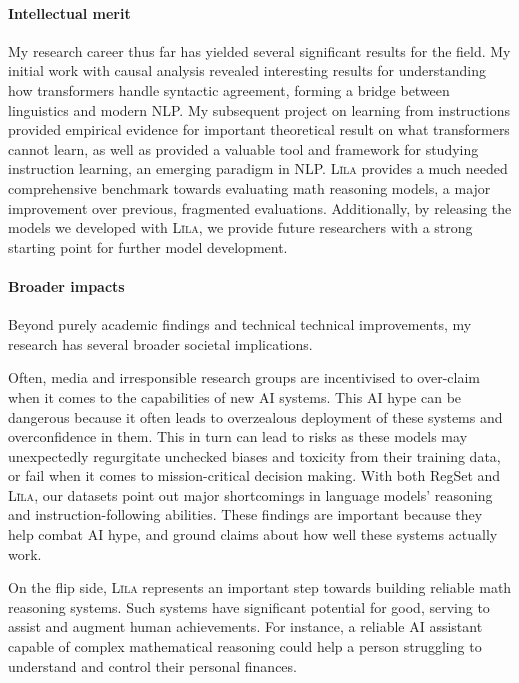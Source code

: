 \documentclass[11pt]{article}
\newcommand\lila{\textsc{L\={\i}la}\xspace}
\begin{document}
\paragraph{Intellectual merit}

My research career thus far has yielded several significant results for the field.
My initial work with causal analysis revealed interesting results for understanding
how transformers handle syntactic agreement, forming a bridge between 
linguistics and modern NLP. 
My subsequent project on learning from instructions provided empirical evidence for
important theoretical result on what transformers cannot learn, 
as well as provided a valuable tool and framework for studying instruction learning, 
an emerging paradigm in NLP.
\lila provides a much needed comprehensive benchmark 
towards evaluating math reasoning models, 
a major improvement over previous, fragmented evaluations.
Additionally, by releasing the models we developed with \lila, 
we provide future researchers with a strong starting point
for further model development.

\paragraph{Broader impacts}

Beyond purely academic findings and technical technical improvements,
my research has several broader societal implications.

Often, media and irresponsible research groups 
are incentivised to over-claim 
when it comes to the capabilities of new AI systems.
This AI hype can be dangerous 
because it often leads to overzealous deployment of these systems
and overconfidence in them.
This in turn can lead to risks as these models may unexpectedly 
regurgitate unchecked biases and toxicity from their training data,
or fail when it comes to mission-critical decision making.
With both RegSet and \lila, our datasets point out major shortcomings 
in language models' reasoning and instruction-following abilities.
These findings are important because they help combat AI hype, 
and ground claims about how well these systems actually work.

On the flip side, \lila represents an important step towards building 
reliable math reasoning systems. 
Such systems have significant potential for good, 
serving to assist and augment human achievements.
For instance, a reliable AI assistant capable of complex mathematical reasoning 
could help a person struggling to understand and control their personal finances.
\end{document}
